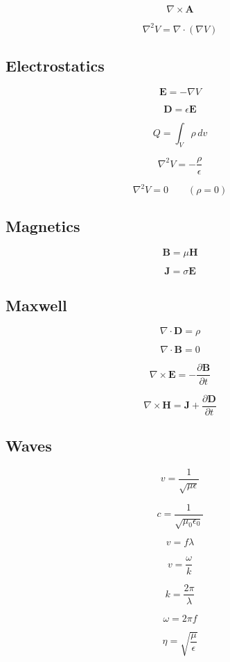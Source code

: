 \documentclass[11pt]{article}
\newcommand{\vect}[1]{\mathbf{#1}}
\begin{document}
\[
\boxed{
\nabla\times\vect{A}
}
\]

\[
\boxed{
\nabla^2V
=
\nabla\cdot(\nabla V)
}
\]

\subsection*{Electrostatics}

\[
\boxed{
\vect{E}
=
-\nabla V
}
\]

\[
\boxed{
\vect{D}
=
\epsilon\vect{E}
}
\]

\[
\boxed{
Q
=
\int_V\rho\,dv
}
\]

\[
\boxed{
\nabla^2V
=
-\frac{\rho}{\epsilon}
}
\]

\[
\boxed{
\nabla^2V=0
\qquad
(\rho=0)
}
\]

\subsection*{Magnetics}

\[
\boxed{
\vect{B}
=
\mu\vect{H}
}
\]

\[
\boxed{
\vect{J}
=
\sigma\vect{E}
}
\]

\subsection*{Maxwell}

\[
\boxed{
\nabla\cdot\vect{D}
=
\rho
}
\]

\[
\boxed{
\nabla\cdot\vect{B}
=
0
}
\]

\[
\boxed{
\nabla\times\vect{E}
=
-\frac{\partial\vect{B}}{\partial t}
}
\]

\[
\boxed{
\nabla\times\vect{H}
=
\vect{J}
+
\frac{\partial\vect{D}}{\partial t}
}
\]

\subsection*{Waves}

\[
\boxed{
v
=
\frac{1}{\sqrt{\mu\epsilon}}
}
\]

\[
\boxed{
c
=
\frac{1}{\sqrt{\mu_0\epsilon_0}}
}
\]

\[
\boxed{
v=f\lambda
}
\]

\[
\boxed{
v=\frac{\omega}{k}
}
\]

\[
\boxed{
k=\frac{2\pi}{\lambda}
}
\]

\[
\boxed{
\omega=2\pi f
}
\]

\[
\boxed{
\eta
=
\sqrt{\frac{\mu}{\epsilon}}
}
\]
\end{document}

